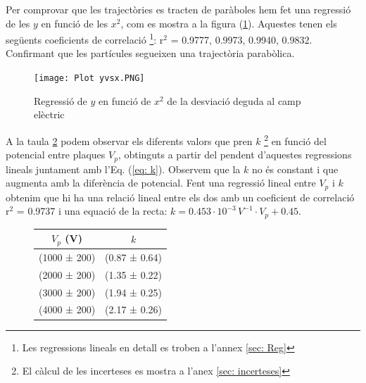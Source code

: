 \documentclass[11pt]{article}
\numberwithin{equation}{section}
\numberwithin{figure}{section}
\numberwithin{table}{section}
\begin{document}
 Per comprovar que les trajectòries es tracten de paràboles hem fet una regressió de les $y$ en funció de les $x^2$, com es mostra a la figura (\ref{fig: Regressió Desv E}). Aquestes tenen els següents coeficients de correlació \footnote{Les regressions lineals en detall es troben a l'annex \ref{sec: Reg}}:
 r$^2$ = 0.9777, 0.9973, 0.9940, 0.9832. Confirmant que les partícules segueixen una trajectòria parabòlica.
\begin{figure}[h]
    \centering
    \begin{minipage}{0.75\textwidth}
    \centering
        \texttt{[image: Plot yvsx.PNG]}
        \caption{Regressió de $y$ en funció de $x^2$  de la desviació deguda al camp elèctric}
        \label{fig: Regressió Desv E}
    \end{minipage}
\end{figure}

A la taula \ref{tab:kvsVp} podem observar els diferents valors que pren $k$ \footnote{El càlcul de les incerteses es mostra a l'anex \ref{sec: incerteses}} en funció del potencial entre plaques $V_p$, obtinguts a partir del pendent d'aquestes regressions lineals juntament amb l'Eq. (\ref{eq: k}). Observem que la $k$ no és constant i que augmenta amb la diferència de potencial. Fent una regressió lineal entre $V_p$ i $k$ obtenim que hi ha una relació lineal entre els dos amb un coeficient de correlació r$^2$ = 0.9737 i una equació de la recta: $k = 0.453 \cdot 10^{-3}\, V^{-1}  \cdot V_p + 0.45$.


\begin{figure}[h]
    \centering
    \begin{minipage}{0.45\textwidth} 
        \centering
        \begin{tabular}{|c|c|}
            \hline
            $V_p$ (V)	&	$k$	\\\hline
            (1000 ± 200)	&	(0.87 ± 0.64)   \\\hline
            (2000 ± 200)	&	(1.35 ± 0.22)	\\\hline
            (3000 ± 200)	&	(1.94 ± 0.25)	\\\hline
            (4000 ± 200)	&	(2.17 ± 0.26)	\\\hline           
        \end{tabular}
        \label{tab:kvsVp}
    \end{minipage}
\end{figure}
\end{document}
